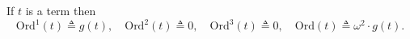 If $t$ is a term then
$$\text{Ord}^1(t) \triangleq g(t), \quad \text{Ord}^2(t) \triangleq 0, \quad \text{Ord}^3(t) \triangleq 0, \quad \text{Ord}(t) \triangleq \omega^2 \cdot g(t).$$
